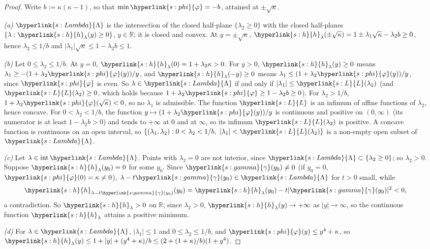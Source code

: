 \documentclass[11pt]{article}
\newcommand{\R}{\mathbb{R}}
\newcommand{\sy}[2]{{\hyperlink{#1}{#2}}}
\newcommand{\phik}{\sy{s:phi}{\varphi}}
\newcommand{\hl}{\sy{s:h}{h}}
\newcommand{\gam}{\sy{s:gamma}{\gamma}}
\newcommand{\Lam}{\sy{s:Lambda}{\Lambda}}
\newcommand{\Lw}{\sy{s:L}{L}}
\begin{document}
\begin{proof}
Write $b:=\kappa(\kappa-1)$, so that $\min\phik=-b$, attained at $\pm\sqrt\kappa$.

\emph{(a)} $\Lam$ is the intersection of the closed half-plane $\{\lambda_2\ge0\}$ with the closed half-planes
$\{\lambda:\hl_\lambda(y)\ge0\}$, $y\in\R$; it is closed and convex. At $y=\pm\sqrt\kappa$, $\hl_\lambda(\pm\sqrt\kappa)=1\pm\lambda_1\sqrt\kappa-\lambda_2b\ge0$,
hence $\lambda_2\le1/b$ and $|\lambda_1|\sqrt\kappa\le1-\lambda_2b\le1$.

\emph{(b)} Let $0\le\lambda_2\le1/b$. At $y=0$, $\hl_\lambda(0)=1+\lambda_2\kappa>0$. For $y>0$, $\hl_\lambda(y)\ge0$ means
$\lambda_1\ge-(1+\lambda_2\phik(y))/y$, and $\hl_\lambda(-y)\ge0$ means $\lambda_1\le(1+\lambda_2\phik(y))/y$, since $\phik$ is even.
So $\lambda\in\Lam$ if and only if $|\lambda_1|\le\Lw(\lambda_2)$ (and $\Lw(\lambda_2)\ge0$, which holds because
$1+\lambda_2\phik\ge1-\lambda_2b\ge0$). For $\lambda_2>1/b$, $1+\lambda_2\phik(\sqrt\kappa)<0$, so no $\lambda_1$ is admissible. The
function $\Lw$ is an infimum of affine functions of $\lambda_2$, hence concave. For $0<\lambda_2<1/b$, the function
$y\mapsto(1+\lambda_2\phik(y))/y$ is continuous and positive on $(0,\infty)$ (its numerator is at least $1-\lambda_2b>0$)
and tends to $+\infty$ at $0$ and at $\infty$, so its infimum $\Lw(\lambda_2)$ is positive. A concave function is
continuous on an open interval, so $\{(\lambda_1,\lambda_2):0<\lambda_2<1/b,\ |\lambda_1|<\Lw(\lambda_2)\}$ is a non-empty open subset of
$\Lam$.

\emph{(c)} Let $\lambda\in\mathrm{int}\,\Lam$. Points with $\lambda_2=0$ are not interior, since $\Lam\subset\{\lambda_2\ge0\}$; so
$\lambda_2>0$. Suppose $\hl_\lambda(y_0)=0$ for some $y_0$. Since $\gam(y_0)\neq0$ (if $y_0=0$, $\phik(0)=\kappa\neq0$),
$\lambda-t\gam(y_0)\in\Lam$ for $t>0$ small, while
\begin{equation*}
  \hl_{\lambda-t\gam(y_0)}(y_0)=\hl_\lambda(y_0)-t|\gam(y_0)|^2<0,
\end{equation*}
a contradiction. So $\hl_\lambda>0$ on $\R$; since $\lambda_2>0$, $\hl_\lambda(y)\to+\infty$ as $|y|\to\infty$, so the continuous
function $\hl_\lambda$ attains a positive minimum.

\emph{(d)} For $\lambda\in\Lam$, $|\lambda_1|\le1$ and $0\le\lambda_2\le1/b$, and $\phik(y)\le y^4+\kappa$, so
$\hl_\lambda(y)\le1+|y|+(y^4+\kappa)/b\le(2+(1+\kappa)/b)(1+y^4)$.
\end{proof}
\end{document}

